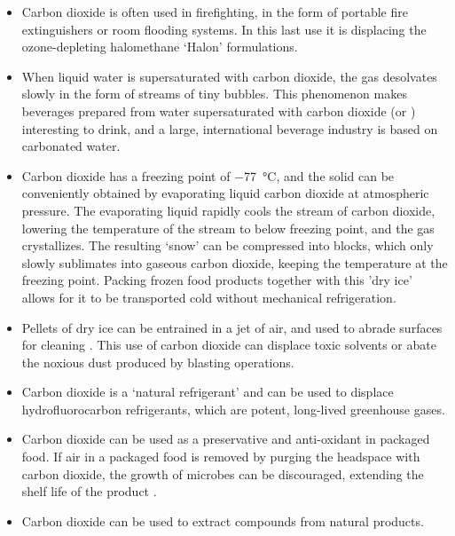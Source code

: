 \begin{itemize}
  
  \item Carbon dioxide is often used in firefighting, in the form of portable
  fire extinguishers or room flooding systems. In this last use it is displacing
  the ozone-depleting halomethane `Halon' formulations.
  
  \item When liquid water is supersaturated with carbon dioxide, the gas
  desolvates slowly in the form of streams of tiny bubbles. This phenomenon
  makes beverages prepared from water supersaturated with carbon dioxide (or
  ) interesting to drink, and a large, international
  beverage industry is based on carbonated water.
   
   \item Carbon dioxide has a freezing point of \SI{-77}{\celsius}, and the
   solid can be conveniently obtained by evaporating liquid carbon dioxide at
   atmospheric pressure. The evaporating liquid rapidly cools the stream of
   carbon dioxide, lowering the temperature of the stream to below freezing
   point, and the gas crystallizes. The resulting `snow' can be compressed into
   blocks, which only slowly sublimates into gaseous carbon dioxide, keeping the
   temperature at the freezing point. Packing frozen food products together with
   this 'dry ice' allows for it to be transported cold without mechanical
   refrigeration.
   
   \item Pellets of dry ice can be entrained in a jet of air, and used to abrade
   surfaces for cleaning \autocite{Spur1999}. This use of carbon dioxide can
   displace toxic solvents or abate the noxious dust produced by blasting operations.
   
   \item Carbon dioxide is a `natural refrigerant' \autocite{Pearson2005} and
   can be used to displace hydrofluorocarbon refrigerants, which are potent,
   long-lived greenhouse gases.
   
   \item Carbon dioxide can be used as a preservative and anti-oxidant in
   packaged food. If air in a packaged food is removed by purging the headspace
   with carbon dioxide, the growth of microbes can be discouraged, extending the
   shelf life of the product \autocite{Jacobsen2002}.
	   
	\item Carbon dioxide can be used to extract compounds from natural products. 
	
\end{itemize}

